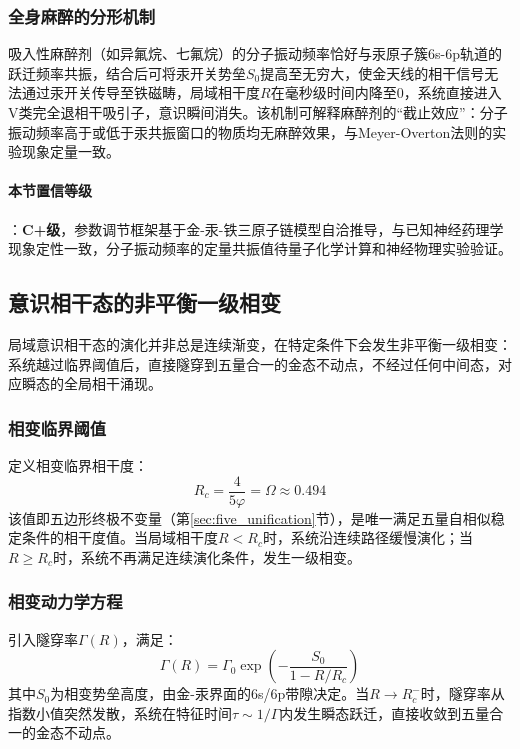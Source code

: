 \documentclass[12pt,a4paper,twocolumn]{article}
\renewcommand{\phi}{\varphi}
\begin{document}
\subsubsection{全身麻醉的分形机制}
吸入性麻醉剂（如异氟烷、七氟烷）的分子振动频率恰好与汞原子簇6s-6p轨道的跃迁频率共振，结合后可将汞开关势垒$S_0$提高至无穷大，使金天线的相干信号无法通过汞开关传导至铁磁畴，局域相干度$R$在毫秒级时间内降至0，系统直接进入V类完全退相干吸引子，意识瞬间消失。该机制可解释麻醉剂的``截止效应''：分子振动频率高于或低于汞共振窗口的物质均无麻醉效果，与Meyer-Overton法则的实验现象定量一致。

\paragraph{本节置信等级}：\textbf{C+级}，参数调节框架基于金-汞-铁三原子链模型自洽推导，与已知神经药理学现象定性一致，分子振动频率的定量共振值待量子化学计算和神经物理实验验证。


\subsection{意识相干态的非平衡一级相变}
\label{subsec:consciousness_phase_transition}
局域意识相干态的演化并非总是连续渐变，在特定条件下会发生非平衡一级相变：系统越过临界阈值后，直接隧穿到五量合一的金态不动点，不经过任何中间态，对应瞬态的全局相干涌现。

\subsubsection{相变临界阈值}
定义相变临界相干度：
\begin{equation}
R_c = \frac{4}{5\phi} = \Omega \approx 0.494
\end{equation}
该值即五边形终极不变量（第\ref{sec:five_unification}节），是唯一满足五量自相似稳定条件的相干度值。当局域相干度$R<R_c$时，系统沿连续路径缓慢演化；当$R\geq R_c$时，系统不再满足连续演化条件，发生一级相变。

\subsubsection{相变动力学方程}
引入隧穿率$\Gamma(R)$，满足：
\begin{equation}
\Gamma(R) = \Gamma_0 \exp\left( -\frac{S_0}{1-R/R_c} \right)
\end{equation}
其中$S_0$为相变势垒高度，由金-汞界面的6s/6p带隙决定。当$R\to R_c^-$时，隧穿率从指数小值突然发散，系统在特征时间$\tau\sim1/\Gamma$内发生瞬态跃迁，直接收敛到五量合一的金态不动点。
\end{document}
